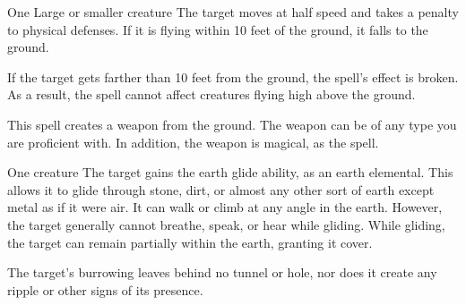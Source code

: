 \begin{spellheader}
    \spellrng{\rngmed}
    \spelldur{\durshort}
\end{spellheader}
\begin{spelleffects}
    \begin{spelltarget}{One Large or smaller creature}
        \spelleffect The target moves at half speed and takes a  penalty to physical defenses. If it is flying within 10 feet of the ground, it falls to the ground.
    \end{spelltarget}
\end{spelleffects}
\begin{spellfooter}
    \spellnotes If the target gets farther than 10 feet from the ground, the spell's effect is broken. As a result, the spell cannot affect creatures flying high above the ground.
\end{spellfooter}

\begin{spellheader}
    \spelldur{\durlong \dismissable}
\end{spellheader}
\begin{spelleffects}
    \spellline
    \spelleffect This spell creates a weapon from the ground. The weapon can be of any type you are proficient with. In addition, the weapon is magical, as the  spell.
\end{spelleffects}

\begin{spellheader}
    \spelldur{\durshort}
\end{spellheader}
\begin{spelleffects}
    \begin{spelltarget}{One creature}
        \spelleffect The target gains the earth glide ability, as an earth elemental. This allows it to glide through stone, dirt, or almost any other sort of earth except metal  as if it were air. It can walk or climb at any angle in the earth. However, the target generally cannot breathe, speak, or hear while gliding. While gliding, the target can remain partially within the earth, granting it cover.
    \end{spelltarget}
\end{spelleffects}
\begin{spellfooter}
    \spellnotes The target's burrowing leaves behind no tunnel or hole, nor does it create any ripple or other signs of its presence.
\end{spellfooter}

